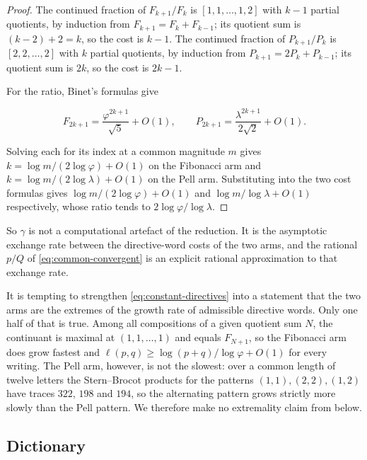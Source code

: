 \begin{proof}
The continued fraction of $F_{k+1}/F_k$ is $[1,1,\ldots,1,2]$ with $k-1$
partial quotients, by induction from $F_{k+1}=F_k+F_{k-1}$; its quotient sum
is $(k-2)+2=k$, so the cost is $k-1$. The continued fraction of
$P_{k+1}/P_k$ is $[2,2,\ldots,2]$ with $k$ partial quotients, by induction
from $P_{k+1}=2P_k+P_{k-1}$; its quotient sum is $2k$, so the cost is
$2k-1$.

For the ratio, Binet's formulas give

\begin{equation}
 F_{2k+1}=\frac{\varphi^{2k+1}}{\sqrt5}+O(1),
 \qquad
 P_{2k+1}=\frac{\lambda^{2k+1}}{2\sqrt2}+O(1).
\end{equation}

Solving each for its index at a
common magnitude $m$ gives $k=\log m/(2\log\varphi)+O(1)$ on the Fibonacci
arm and $k=\log m/(2\log\lambda)+O(1)$ on the Pell arm. Substituting into
the two cost formulas gives $\log m/(2\log\varphi)+O(1)$ and
$\log m/\log\lambda+O(1)$ respectively, whose ratio tends to
$2\log\varphi/\log\lambda$.
\end{proof}

So $\gamma$ is not a computational artefact of the reduction. It is the
asymptotic exchange rate between the directive-word costs of the two arms,
and the rational $p/Q$ of \cref{eq:common-convergent} is an explicit
rational approximation to that exchange rate.

\begin{remark}
\label{rem:not-extremal}
It is tempting to strengthen \cref{eq:constant-directives} into a statement
that the two arms are the extremes of the growth rate of admissible directive
words. Only one half of that is true. Among all compositions of a given
quotient sum $N$, the continuant is maximal at $(1,1,\ldots,1)$ and equals
$F_{N+1}$, so the Fibonacci arm does grow fastest and
$\ell(p,q)\geqslant\log(p+q)/\log\varphi+O(1)$ for every writing. The Pell
arm, however, is not the slowest: over a common length of twelve letters the
Stern--Brocot products for the patterns $(1,1),(2,2),(1,2)$ have traces
$322$, $198$ and $194$, so the alternating pattern grows strictly more slowly
than the Pell pattern. We therefore make no extremality claim from below.
\end{remark}

\subsection{Dictionary}

